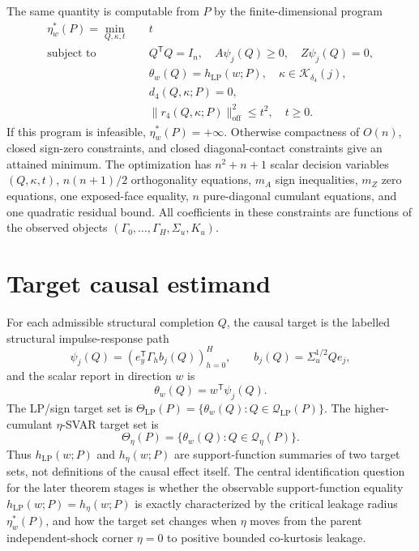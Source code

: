 \documentclass[11pt]{article}
\newcommand{\transpose}{\mathsf{T}}
\theoremstyle{definition}
\theoremstyle{plain}
\theoremstyle{remark}
\begin{document}
The same quantity is computable from \(P\) by the finite-dimensional program
\[
\begin{aligned}
\eta_w^*(P)=\min_{Q,\kappa,t}\quad & t\\
\text{subject to}\quad
& Q^\transpose Q=I_n,\quad A\psi_j(Q)\ge0,\quad Z\psi_j(Q)=0,\\
& \theta_w(Q)=h_{\mathrm{LP}}(w;P),\quad \kappa\in\mathcal K_{\delta_4}(j),\\
& d_4(Q,\kappa;P)=0,\\
& \|r_4(Q,\kappa;P)\|_{\mathrm{off}}^2\le t^2,\quad t\ge0 .
\end{aligned}
\]
If this program is infeasible, \(\eta_w^*(P)=+\infty\).  Otherwise compactness of \(O(n)\), closed sign-zero constraints, and closed diagonal-contact constraints give an attained minimum.  The optimization has \(n^2+n+1\) scalar decision variables \((Q,\kappa,t)\), \(n(n+1)/2\) orthogonality equations, \(m_A\) sign inequalities, \(m_Z\) zero equations, one exposed-face equality, \(n\) pure-diagonal cumulant equations, and one quadratic residual bound.  All coefficients in these constraints are functions of the observed objects \((\Gamma_0,\ldots,\Gamma_H,\Sigma_u,K_u)\).

\section{Target causal estimand}
For each admissible structural completion \(Q\), the causal target is the labelled structural impulse-response path
\[
\psi_j(Q)=\left(e_y^\transpose\Gamma_h b_j(Q)\right)_{h=0}^H,
\qquad b_j(Q)=\Sigma_u^{1/2}Qe_j,
\]
and the scalar report in direction \(w\) is
\[
\theta_w(Q)=w^\transpose\psi_j(Q).
\]
The LP/sign target set is \(\Theta_{\mathrm{LP}}(P)=\{\theta_w(Q):Q\in\mathcal Q_{\mathrm{LP}}(P)\}\).  The higher-cumulant \(\eta\)-SVAR target set is
\[
\Theta_\eta(P)=\{\theta_w(Q):Q\in\mathcal Q_\eta(P)\}.
\]
Thus \(h_{\mathrm{LP}}(w;P)\) and \(h_\eta(w;P)\) are support-function summaries of two target sets, not definitions of the causal effect itself.  The central identification question for the later theorem stages is whether the observable support-function equality \(h_{\mathrm{LP}}(w;P)=h_\eta(w;P)\) is exactly characterized by the critical leakage radius \(\eta_w^*(P)\), and how the target set changes when \(\eta\) moves from the parent independent-shock corner \(\eta=0\) to positive bounded co-kurtosis leakage.
\end{document}

